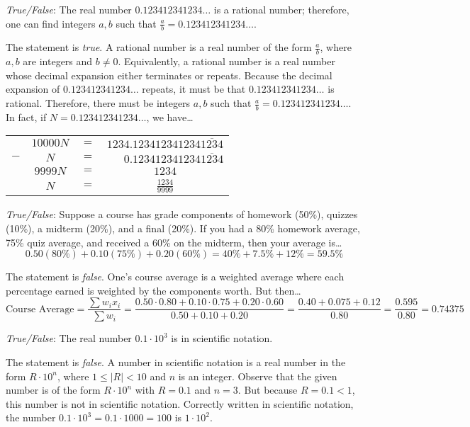 \documentclass[11pt,letterpaper]{article}
\begin{document}
\newpage



\quizsol \textit{True/False}: The real number $0.123412341234\ldots$ is a rational number; therefore, one can find integers $a, b$ such that $\frac{a}{b}= 0.123412341234\ldots$. \pspace

\sol The statement is \textit{true}. A rational number is a real number of the form $\frac{a}{b}$, where $a, b$ are integers and $b \neq 0$. Equivalently, a rational number is a real number whose decimal expansion either terminates or repeats. Because the decimal expansion of $0.123412341234\ldots$ repeats, it must be that $0.123412341234\ldots$ is rational. Therefore, there must be integers $a, b$ such that $\frac{a}{b}= 0.123412341234\dots$. In fact, if $N= 0.123412341234\dots$, we have\ldots
	\begin{table}[!ht]
	\centering\small
	\begin{tabular}{rccc}
	& $10000N$ & $=$ & $1234.123412341234\overline{1234}$ \\ 
	$-$ & $N$ & $=$ & $\phantom{123}0.123412341234\overline{1234}$ \\ \hline
	& $9999N$ & $=$ & $1234$ \\[0.1cm]
	& $N$ & $=$ & $\frac{1234}{9999}$
	\end{tabular}
	\end{table} \pvspace{1.3cm}



\quizsol \textit{True/False}: Suppose a course has grade components of homework (50\%), quizzes (10\%), a midterm (20\%), and a final (20\%). If you had a 80\% homework average, 75\% quiz average, and received a 60\% on the midterm, then your average is\dots
	\[
	0.50(80\%) + 0.10(75\%) + 0.20(60\%)= 40\% + 7.5\% + 12\%= 59.5\%
	\] 

\sol The statement is \textit{false}. One's course average is a weighted average where each percentage earned is weighted by the components worth. But then\dots
	\[
	\text{Course Average}= \dfrac{\sum w_i x_i}{\sum w_i}= \dfrac{0.50 \cdot 0.80 + 0.10 \cdot 0.75 + 0.20 \cdot 0.60}{0.50 + 0.10 + 0.20}= \dfrac{0.40 + 0.075 + 0.12}{0.80}= \dfrac{0.595}{0.80}= 0.74375
	\] \pvspace{1.3cm}



\quizsol \textit{True/False}: The real number $0.1 \cdot 10^3$ is in scientific notation. \pspace

\sol The statement is \textit{false}. A number in scientific notation is a real number in the form $R \cdot 10^n$, where $1 \leq |R| < 10$ and $n$ is an integer. Observe that the given number is of the form $R \cdot 10^n$ with $R= 0.1$ and $n= 3$. But because $R= 0.1 < 1$, this number is not in scientific notation. Correctly written in scientific notation, the number $0.1 \cdot 10^3= 0.1 \cdot 1000= 100$ is $1 \cdot 10^2$. \pvspace{1.3cm}
\end{document}
